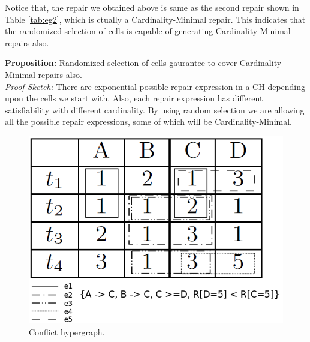 Notice that, the repair we obtained above is same as the second repair shown in Table \ref{tab:eg2}, which is ctually a Cardinality-Minimal repair.
This indicates that the randomized selection of cells is capable of generating Cardinality-Minimal repairs also.

\textbf{Proposition:} Randomized selection of cells gaurantee to cover Cardinality-Minimal repairs also. \\
\textit{Proof Sketch:} There are exponential possible repair expression in a CH depending upon the cells we start with.
Also, each repair expression has different satisfiability with different cardinality.
By using random selection we are allowing all the possible repair expressions, some of which will be Cardinality-Minimal.


\begin{figure}
   \centering
   \includegraphics[scale=0.25]{ch.png}
   \caption{Conflict hypergraph.}
   \label{fig:ch}
\end{figure}

